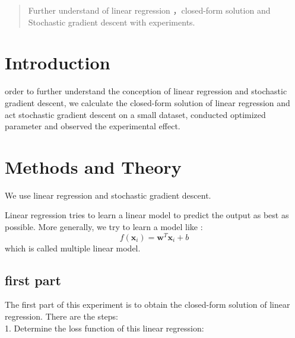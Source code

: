 \documentclass[journal, a4paper]{IEEEtran}
\begin{document}
\begin{abstract}
Further understand of linear regression ，closed-form solution and Stochastic gradient descent with experiments.
\end{abstract}

\section{Introduction}
 order to further understand the conception of linear regression and stochastic gradient descent, we calculate the closed-form solution of linear regression and act stochastic gradient descent on a small dataset, conducted optimized parameter and observed the experimental effect.

\section{Methods and Theory}
We use linear regression and stochastic gradient descent. 

 Linear regression tries to learn a linear model to predict the output as best as possible.  More generally, we try to learn a model like : 
 $$ f(\boldsymbol{x}_i) = \boldsymbol{w}^T\boldsymbol{x}_i +b $$
 which is called multiple linear model.\par
 \subsection{first part}
 The first part of this experiment is to obtain the closed-form solution of linear regression. There are the steps:
\\1. Determine the loss function of this linear regression:\\
\end{document}
